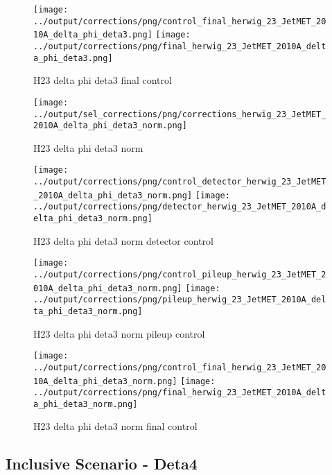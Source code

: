 \documentclass[11pt]{book}
\begin{document}
\begin{figure}[ht]
\centering
\texttt{[image: ../output/corrections/png/control\_final\_herwig\_23\_JetMET\_2010A\_delta\_phi\_deta3.png]}
\texttt{[image: ../output/corrections/png/final\_herwig\_23\_JetMET\_2010A\_delta\_phi\_deta3.png]}
\caption{H23 delta phi deta3 final control}
\label{fig:H23_JetMET_2010A_delta_phi_deta3_final_control}
\end{figure}


\begin{figure}[ht]
\centering
\texttt{[image: ../output/sel\_corrections/png/corrections\_herwig\_23\_JetMET\_2010A\_delta\_phi\_deta3\_norm.png]}
\caption{H23 delta phi deta3 norm}
\label{fig:H23_JetMET_2010A_delta_phi_deta3_norm}
\end{figure}

\begin{figure}[ht]
\centering
\texttt{[image: ../output/corrections/png/control\_detector\_herwig\_23\_JetMET\_2010A\_delta\_phi\_deta3\_norm.png]}
\texttt{[image: ../output/corrections/png/detector\_herwig\_23\_JetMET\_2010A\_delta\_phi\_deta3\_norm.png]}
\caption{H23 delta phi deta3 norm detector control}
\label{fig:H23_JetMET_2010A_delta_phi_deta3_norm_detector_control}
\end{figure}

\begin{figure}[ht]
\centering
\texttt{[image: ../output/corrections/png/control\_pileup\_herwig\_23\_JetMET\_2010A\_delta\_phi\_deta3\_norm.png]}
\texttt{[image: ../output/corrections/png/pileup\_herwig\_23\_JetMET\_2010A\_delta\_phi\_deta3\_norm.png]}
\caption{H23 delta phi deta3 norm pileup control}
\label{fig:H23_JetMET_2010A_delta_phi_deta3_norm_pileup_control}
\end{figure}


\begin{figure}[ht]
\centering
\texttt{[image: ../output/corrections/png/control\_final\_herwig\_23\_JetMET\_2010A\_delta\_phi\_deta3\_norm.png]}
\texttt{[image: ../output/corrections/png/final\_herwig\_23\_JetMET\_2010A\_delta\_phi\_deta3\_norm.png]}
\caption{H23 delta phi deta3 norm final control}
\label{fig:H23_JetMET_2010A_delta_phi_deta3_norm_final_control}
\end{figure}


\clearpage
\subsection{Inclusive Scenario - Deta4}
\end{document}
